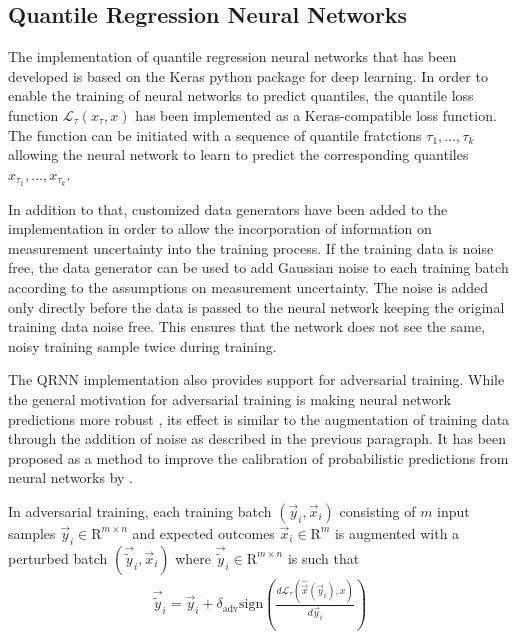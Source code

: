 \documentclass[journal abbreviation, manuscript]{copernicus}
\begin{document}
\subsection{Quantile Regression Neural Networks}

    The implementation of quantile regression neural networks that has been
    developed is based on the Keras python package for deep learning. In order
    to enable the training of neural networks to predict quantiles, the quantile
    loss function $\mathcal{L}_\tau(x_\tau, x)$ has been implemented as a
    Keras-compatible loss function. The function can be initiated with a
    sequence of quantile fratctions $\tau_1, \ldots, \tau_k$ allowing the neural
    network to learn to predict the corresponding quantiles $x_{\tau_1}, \ldots,
    x_{\tau_k}$.

    In addition to that, customized data generators have been added to the
    implementation in order to allow the incorporation of information on
    measurement uncertainty into the training process. If the training data is
    noise free, the data generator can be used to add Gaussian noise to each
    training batch according to the assumptions on measurement uncertainty. The
    noise is added only directly before the data is passed to the neural network
    keeping the original training data noise free. This ensures that the network
    does not see the same, noisy training sample twice during training.

    The QRNN implementation also provides support for adversarial training.
    While the general motivation for adversarial training is making neural
    network predictions more robust \citep{goodfellow_2}, its effect is similar
    to the augmentation of training data through the addition of noise as
    described in the previous paragraph. It has been proposed as a method to
    improve the calibration of probabilistic predictions from neural networks by
    \cite{lakshminarayanan}.

    In adversarial training, each training batch $(\vec{y}_i, \vec{x}_i)$
    consisting of $m$ input samples $\vec{y}_i \in \mathrm{R}^{m \times n}$ and
    expected outcomes $\vec{x}_i \in \mathrm{R}^m$ is augmented with a perturbed
    batch $(\vec{\tilde{y}}_i, \vec{x}_i)$ where $\vec{\tilde{y}}_i \in
    \mathrm{R}^{m \times n}$ is such that
    \begin{align}
      \vec{\tilde{y}}_i = \vec{y}_i + \delta_\text{adv} \text{sign} \left (
      \frac{d \mathcal{L}_\tau(\hat{\vec{x}}(\vec{y}_i), x)}{d\vec{y}_i} \right
      )
    \end{align}
\end{document}

